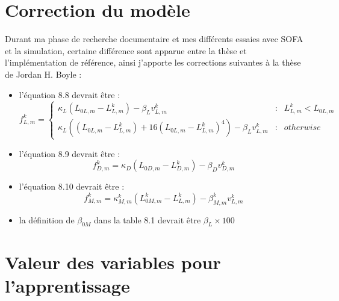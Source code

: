 \chapter{Correction du modèle} %
\label{cha:Correction du modèle}

Durant ma phase de recherche documentaire et mes différents essaies avec
SOFA et la simulation, certaine différence sont apparue entre la thèse
et l'implémentation de référence, ainsi j'apporte les corrections suivantes
à la thèse de Jordan H. Boyle \cite{Boyle2009} :
\begin{itemize}
   \item l'équation 8.8 devrait être :
      \begin{equation}
      f^k_{L,m} = \left\{ 
         \begin{array}{rcl}
            \kappa_L(L_{0L,m} - L_{L,m}^k) - \beta_{L}v_{L,m}^k & : & L_{L,m}^k < L_{0L,m}\\
            \kappa_L((L_{0L,m} - L_{L,m}^k) + 16(L_{0L,m} - L_{L,m}^k)^4) - \beta_{L}v_{L,m}^k & : & otherwise
         \end{array}
         \right.
      \end{equation}
   \item l'équation 8.9 devrait être :
      \begin{equation}
      f_{D,m}^k = \kappa_D(L_{0D,m} - L_{D,m}^k) - \beta_{D}v_{D,m}^k
      \end{equation}
   \item l'équation 8.10 devrait être :
      \begin{equation}
      f_{M,m}^k = \kappa_{M,m}^k(L_{0M,m}^k - L_{L,m}^k) - \beta_{M,m}^{k}v_{L,m}^k
      \end{equation}
   \item la définition de $\beta_{0M}$ dans la table 8.1 devrait être $\beta_L \times 100$
\end{itemize}


\chapter{Valeur des variables pour l'apprentissage} %
\label{cha:Valeur des variables pour l'apprentissage}

